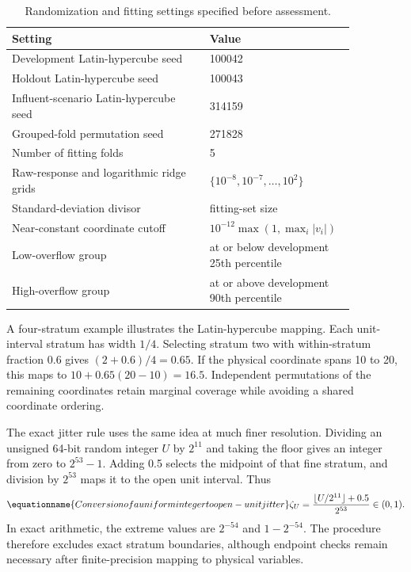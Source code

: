 \begin{table}[htbp]
\centering\small
\caption{Randomization and fitting settings specified before assessment.}
\label{tab:plant_design_settings}
\begin{tabular}{p{0.54\linewidth}p{0.32\linewidth}}
\toprule Setting & Value\\\midrule
Development Latin-hypercube seed & 100042\\
Holdout Latin-hypercube seed & 100043\\
Influent-scenario Latin-hypercube seed & 314159\\
Grouped-fold permutation seed & 271828\\
Number of fitting folds & 5\\
Raw-response and logarithmic ridge grids & $\{10^{-8},10^{-7},\ldots,10^2\}$\\
Standard-deviation divisor & fitting-set size\\
Near-constant coordinate cutoff & $10^{-12}\max(1,\max_i|v_i|)$\\
Low-overflow group & at or below development 25th percentile\\
High-overflow group & at or above development 90th percentile\\
\bottomrule
\end{tabular}
\end{table}

A four-stratum example illustrates the Latin-hypercube mapping. Each unit-interval stratum has width $1/4$. Selecting stratum two with within-stratum fraction 0.6 gives $(2+0.6)/4=0.65$. If the physical coordinate spans 10 to 20, this maps to $10+0.65(20-10)=16.5$. Independent permutations of the remaining coordinates retain marginal coverage while avoiding a shared coordinate ordering.

The exact jitter rule uses the same idea at much finer resolution. Dividing an unsigned 64-bit random integer $U$ by $2^{11}$ and taking the floor gives an integer from zero to $2^{53}-1$. Adding 0.5 selects the midpoint of that fine stratum, and division by $2^{53}$ maps it to the open unit interval. Thus
\begin{equation}
\equationname{Conversion of a uniform integer to open-unit jitter}
\zeta_U=\frac{\lfloor U/2^{11}\rfloor+0.5}{2^{53}}\in(0,1).
\end{equation}
In exact arithmetic, the extreme values are $2^{-54}$ and $1-2^{-54}$. The procedure therefore excludes exact stratum boundaries, although endpoint checks remain necessary after finite-precision mapping to physical variables.

